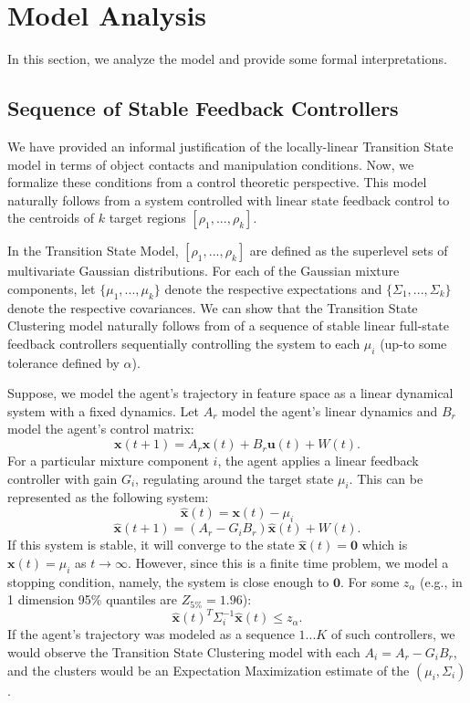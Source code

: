 %

\section{Model Analysis}
In this section, we analyze the model and provide some formal interpretations.

\subsection{Sequence of Stable Feedback Controllers}\label{sec:control}
We have provided an informal justification of the locally-linear Transition State model in terms of object contacts and manipulation conditions.
Now, we formalize these conditions from a control theoretic perspective.
This model naturally follows from a system controlled with linear state feedback control to the centroids of $k$ target regions $[\rho_1,...,\rho_k]$. 

In the Transition State Model,  $[\rho_1,...,\rho_k]$ are defined as the superlevel sets of multivariate Gaussian distributions.
For each of the Gaussian mixture components, let $\{\mu_1,...,\mu_k\}$ denote the respective expectations and $\{\Sigma_1,...,\Sigma_k\}$ denote the respective covariances.
We can show that the Transition State Clustering model naturally follows from of a sequence of stable linear full-state feedback controllers sequentially controlling the system to each $\mu_i$ (up-to some tolerance defined by $\alpha$).

Suppose, we model the agent's trajectory in feature space as a linear dynamical system with a fixed dynamics.
Let $A_r$ model the agent's linear dynamics and $B_r$ model the agent's control matrix:
\[
\mathbf{x}(t+1) = A_r\mathbf{x}(t) + B_r\mathbf{u}(t) + W(t).
\]
For a particular mixture component $i$, the agent applies a linear feedback controller with gain $G_i$, regulating around the target state $\mu_i$.
This can be represented as the following system:
\[
\hat{\mathbf{x}}(t) = \mathbf{x}(t) - \mu_i 
\]
\[
\hat{\mathbf{x}}(t+1) = (A_r-G_iB_r)\hat{\mathbf{x}}(t)+ W(t).
\]
If this system is stable, it will converge to the state $\hat{\mathbf{x}}(t) = \mathbf{0}$ which is  $\mathbf{x}(t) = \mu_i$ as $t \rightarrow \infty$.
However, since this is a finite time problem, we model a stopping condition, namely, the system is close enough to $\mathbf{0}$.
For some $z_\alpha$ (e.g., in 1 dimension 95\% quantiles are $Z_{5\%} = 1.96$):
\[
\hat{\mathbf{x}}(t)^T \Sigma^{-1}_i \hat{\mathbf{x}}(t) \le z_\alpha.
\]
If the agent's trajectory was modeled as a sequence $1...K$ of such controllers, we would observe the Transition State Clustering model with each $A_i = A_r-G_iB_r$, and the clusters would be an Expectation Maximization estimate of the $(\mu_i, \Sigma_i)$.

